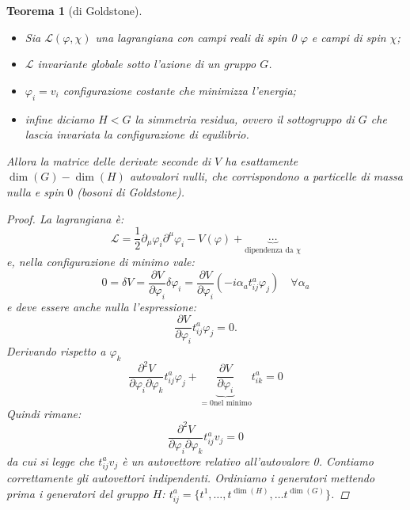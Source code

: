 \documentclass[italian,a4paper]{article}
\newtheorem*{theorem}{Teorema}
\theoremstyle{definition}
\newcommand{\lagr}{\ensuremath{\mathscr{L}}}
\begin{document}
\begin{theorem}[di Goldstone]
    \label{teorema_goldstone}
    \hspace*{\fill}
    \begin{itemize}
        \item Sia $\lagr(\varphi, \chi)$ una lagrangiana con campi reali di spin 0
    $\varphi$ e campi di spin  $\chi$;
        \item $\lagr$ invariante globale sotto l'azione di un gruppo $G$.
        \item $\varphi_i = v_i$ configurazione costante che minimizza
            l'energia;
        \item infine diciamo $H < G$ la simmetria residua, ovvero il
            sottogruppo di $G$ che lascia invariata la configurazione di
            equilibrio.
    \end{itemize}
    Allora la matrice delle derivate seconde di $V$ ha esattamente
    $\dim(G) - \dim(H)$ autovalori nulli, che corrispondono a particelle di
    massa nulla e spin $0$ (bosoni di Goldstone).
    \begin{proof}
        La lagrangiana \`e:
        \begin{equation*}
            \lagr = \dfrac{1}{2}\partial_\mu \varphi_i\partial^\mu
            \varphi_i- V(\varphi) + \underbrace{\cdots}_{\text{dipendenza da
            } \chi}
        \end{equation*}
        e, nella configurazione di minimo vale:
        \begin{equation*}
            0 = \delta V = \dfrac{\partial V}{\partial \varphi_i}\delta \varphi_i = 
            \dfrac{\partial V}{\partial \varphi_i}(-i \alpha_a
            t^a_{ij}\varphi_j) \quad \forall \alpha_a
        \end{equation*}
        e deve essere anche nulla l'espressione:
        \begin{equation*}
             \dfrac{\partial V}{\partial \varphi_i}t^a_{ij}\varphi_j = 0.
        \end{equation*}
        Derivando rispetto a $\varphi_k$
        \begin{equation*}
            \dfrac{\partial^2 V}{\partial\varphi_i
            \partial\varphi_k}t^a_{ij}\varphi_j +
            \underbrace{\dfrac{\partial V}{\partial \varphi_i}}_{=0\text{
            nel minimo}}t^a_{ik} = 0
        \end{equation*}
        Quindi rimane:
        \begin{equation*}
            \dfrac{\partial^2 V}{\partial\varphi_i
            \partial\varphi_k}t^a_{ij}v_j = 0 
        \end{equation*}
        da cui si legge che $t^a_{ij}v_j$ \`e un autovettore relativo
        all'autovalore 0. Contiamo correttamente gli autovettori indipendenti. Ordiniamo i generatori mettendo prima i
        generatori del gruppo $H$: $t^a_{ij} = \{t^1,\ldots,t^{\dim(H)},
        \ldots t^{\dim(G)} \}$.


\end{proof}
\end{theorem}
\end{document}
